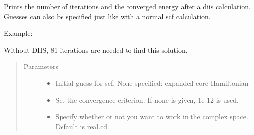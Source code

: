 \documentclass[letterpaper,10pt,english]{sphinxmanual}
\begin{document}
\begin{fulllineitems}
\begin{fulllineitems}
\label{\detokenize{GHF:hf.GHF.GHF.get_scf_solution_diis}}
Prints the number of iterations and the converged energy after a diis calculation. Guesses can also be specified
just like with a normal scf calculation.

Example:

\begin{sphinxVerbatim}[commandchars=\\\{\}]
          
   
  
\end{sphinxVerbatim}

Without DIIS, 81 iterations are needed to find this solution.
\begin{quote}\begin{description}
\item[{Parameters}] \leavevmode\begin{itemize}
\item {} 
 \textendash{} Initial guess for scf. None specified: expanded core Hamiltonian

\item {} 
 \textendash{} Set the convergence criterion. If none is given, 1e-12 is used.

\item {} 
 \textendash{} Specify whether or not you want to work in the complex space. Default is real.cd


\end{itemize}
\end{description}
\end{quote}
\end{fulllineitems}
\end{fulllineitems}
\end{document}
